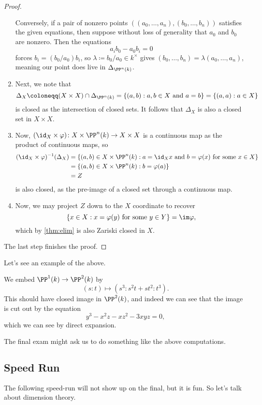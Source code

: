 \begin{proof}
\begin{enumerate}
		Conversely, if a pair of nonzero points $((a_0,\ldots,a_n),(b_0,\ldots,b_n))$ satisfies the given equations, then suppose without loss of generality that $a_0$ and $b_0$ are nonzero. Then the equations
		\[a_ib_0-a_0b_i=0\]
		forces $b_i=(b_0/a_0)b_i$, so $\lambda\coloneqq b_0/a_0\in k^\times$ gives $(b_0,\ldots,b_n)=\lambda(a_0,\ldots,a_n)$, meaning our point does live in $\Delta_{\PP^n(k)}$.
		\item Next, we note that
		\[\Delta_X\coloneqq(X\times X)\cap\Delta_{\PP^n(k)}=\{(a,b):a,b\in X\text{ and }a=b\}=\{(a,a):a\in X\}\]
		is closed as the intersection of closed sets. It follows that $\Delta_X$ is also a closed set in $X\times X$.
		\item Now, $(\id_X\times\varphi)\colon X\times\PP^n(k)\to X\times X$ is a continuous map as the product of continuous maps, so
		\begin{align*}
			(\id_X\times\varphi)^{-1}(\Delta_X) &= \{(a,b)\in X\times\PP^n(k):a=\id_Xx\text{ and }b=\varphi(x)\text{ for some }x\in X\} \\
			&= \{(a,b)\in X\times\PP^n(k):b=\varphi(a)\} \\
			&= Z
		\end{align*}
		is also closed, as the pre-image of a closed set through a continuous map.
		\item Now, we may project $Z$ down to the $X$ coordinate to recover
		\[\{x\in X:x=\varphi(y)\text{ for some }y\in Y\}=\im\varphi,\]
		which by \autoref{thm:elim} is also Zariski closed in $X$.
	\end{enumerate}
	The last step finishes the proof.
\end{proof}
Let's see an example of the above.
\begin{ex}
	We embed $\PP^1(k)\to\PP^2(k)$ by
	\[(s:t)\mapsto\left(s^3:s^2t+st^2:t^3\right).\]
	This should have closed image in $\PP^2(k)$, and indeed we can see that the image is cut out by the equation
	\[y^3-x^2z-xz^2-3xyz=0,\]
	which we can see by direct expansion.
\end{ex}
\begin{remark}
	The final exam might ask us to do something like the above computations.
\end{remark}

\subsection{Speed Run}
The following speed-run will not show up on the final, but it is fun. So let's talk about dimension theory.

